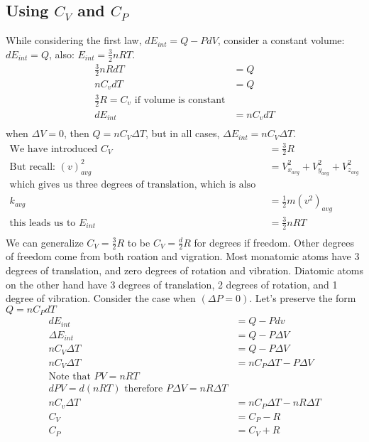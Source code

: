 	\subsection{Using $C_V$ and $C_P$}
	While considering the first law, $dE_{int}=Q-PdV$, consider a constant volume: $dE_{int}=Q$, also: $E_{int}=\frac{3}{2}nRT$.
	\begin{align*}
	\frac{3}{2}nRdT&=Q\\
	nC_vdT &=Q\\
	\frac{3}{2}R=C_v \text{ if volume is constant}\\
	dE_{int}&=nC_vdT\\
	\end{align*}
	when $\Delta V=0$, then $Q=nC_V\Delta T$, but in all cases, $\Delta E_{int}= nC_V\Delta T$.
	\newline
	\begin{align*}
	\text{We have introduced } C_V&=\frac{3}{2}R\\
	\text{But recall: } (v)_{avg}^2&=V_{x_{avg}}^2+V_{y_{avg}}^2+V_{z_{avg}}^2\\
	\text{which gives us three degrees of translation, which is also why:}\\
	k_{avg}&=\frac{1}{2}m(v^2)_{avg}\\
	\text{this leads us to } E_{int}&=\frac{3}{2}nRT\\
	\end{align*}
	We can generalize $C_V=\frac{3}{2}R$ to be $C_V=\frac{d}{2}R$ for degrees if freedom. Other degrees of freedom come from both roation and vigration. Most monatomic atoms have 3 degrees of translation, and zero degrees of rotation and vibration. Diatomic atoms on the other hand have 3 degrees of translation, 2 degrees of rotation, and 1 degree of vibration.
	\newline
	\newline
	Consider the case when $(\Delta P=0)$. Let's preserve the form $Q=nC_PdT$
	\begin{align*}
	dE_{int}&=Q-Pdv\\
	\Delta E_{int}&=Q-P\Delta V\\
	nC_V\Delta T&=Q-P\Delta V\\
	nC_V\Delta T &= nC_P\Delta T-P\Delta V\\
	\text{Note that } PV=nRT\\
	dPV=d(nRT) \text{ therefore }P\Delta V=nR\Delta T\\
	nC_v\Delta T&=nC_P \Delta T-nR\Delta T\\
	C_V&=C_P-R\\
	C_P&=C_V+R\\
	\end{align*}

